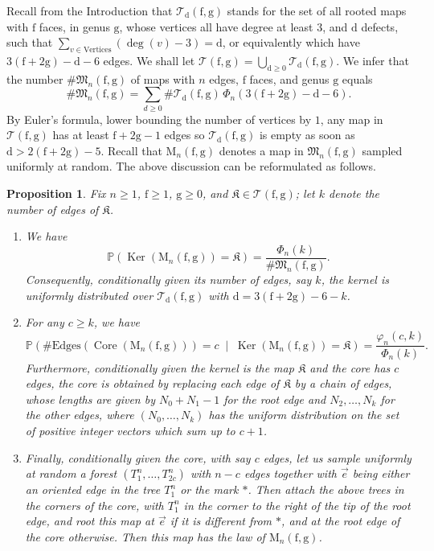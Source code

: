 \documentclass[10pt]{amsart}
\theoremstyle{plain}
\newtheorem{proposition}[theorem]{Proposition}
\theoremstyle{definition}
\theoremstyle{remark}
\renewcommand{\P}{\mathbb{P}}
\newcommand{\Map}{\mathrm{M}}
\newcommand{\face}{\mathrm{f}}
\newcommand{\defect}{\mathrm{d}}
\newcommand{\gen}{\mathrm{g}}
\DeclareMathOperator{\Core}{Core}
\DeclareMathOperator{\Ker}{Ker}
\newcommand{\kernel}{\mathfrak{K}}
\begin{document}
Recall from the Introduction that
$\mathcal{T}_{\defect}(\face,\gen)$ stands for the set of all rooted maps with $ \face$ faces, in genus $ \gen$, whose vertices all have degree at least $3$, and $\defect$ defects, \ie such that $\sum_{v \in \mathrm{Vertices}} (\deg(v)-3) = \defect$, or equivalently which have $3(\face+2\gen) - \defect - 6$ edges.
We shall let $\mathcal{T}(\face,\gen) = \bigcup_{\defect \ge 0} \mathcal{T}_{\defect}(\face,\gen)$.
We infer that the number $\#\mathfrak{M}_n(\face,\gen)$ of maps with $n$ edges, $\face$ faces, and genus $\gen$ equals
\[
\#\mathfrak{M}_n(\face,\gen) = \sum_{d \ge 0} \# \mathcal{T}_{\defect}(\face,\gen)\, \Phi_n(3(\face+2\gen) - \defect - 6).
\]
By Euler's formula, lower bounding the number of vertices by $1$, any map in $\mathcal{T}(\face,\gen)$ has at least $\face+2\gen-1$ edges so $\mathcal{T}_{\defect}(\face,\gen)$ is empty as soon as $\defect > 2(\face+2\gen)-5$.
Recall that $\Map_{n}(\face,\gen)$ denotes a map in $\mathfrak{M}_n(\face,\gen)$ sampled uniformly at random.
The above discussion can be reformulated as follows.

\begin{proposition}\label{prop:loi_core_kernel}
Fix $n\ge1$, $\face \geq 1$, $\gen\ge0$, and $\kernel \in \mathcal{T}(\face,\gen)$; let $k$ denote the number of edges of $\kernel$.
\begin{enumerate}
\item We have
\[
\P \left(\Ker(\Map_n(\face,\gen)) = \kernel \right) = \frac{\Phi_{n}(k)}{\# \mathfrak{M}_n(\face,\gen)}.
\]
Consequently, conditionally given its number of edges, say
$k$, the kernel is uniformly distributed over $\mathcal{T}_\defect(\face,\gen)$ with $\defect=3(\face+2\gen)-6-k$.

\item For any $c \geq k$, we have
\[
\P \left(\#\mathrm{Edges}(\Core(\Map_n(\face,\gen))) = c \;\middle|\; \Ker(\Map_n(\face,\gen)) = \kernel \right) = \frac{\varphi_{n}(c,k)}{\Phi_{n}(k)}.
\]
Furthermore, conditionally given
the kernel is the map $\kernel$ and the core has $c$ edges, the core is obtained by replacing each edge of $\kernel$ by a chain of edges,
whose lengths are given by $N_0+N_1-1$ for the root edge and $N_2, \dots, N_k$ for the other edges, where $(N_0, \dots, N_k)$ has the uniform distribution on the set of positive integer vectors which sum up to $c+1$.

\item Finally, conditionally given the core, with say $c$ edges, let us sample uniformly at random a forest $(T^n_{1}, \dots, T^n_{2c})$ with $n-c$ edges together with $\vec{e}$ being either an oriented edge in the tree $T^n_1$ or the mark $\ast$.
Then attach the above trees in the corners of the core, with $T^n_1$ in the corner to the right of the tip of the root edge, and root this map at $\vec{e}$ if it is different from $\ast$, and at the root edge of the core otherwise. Then this map has the law of $\Map_n(\face,\gen)$.
\end{enumerate}
\end{proposition}
\end{document}
